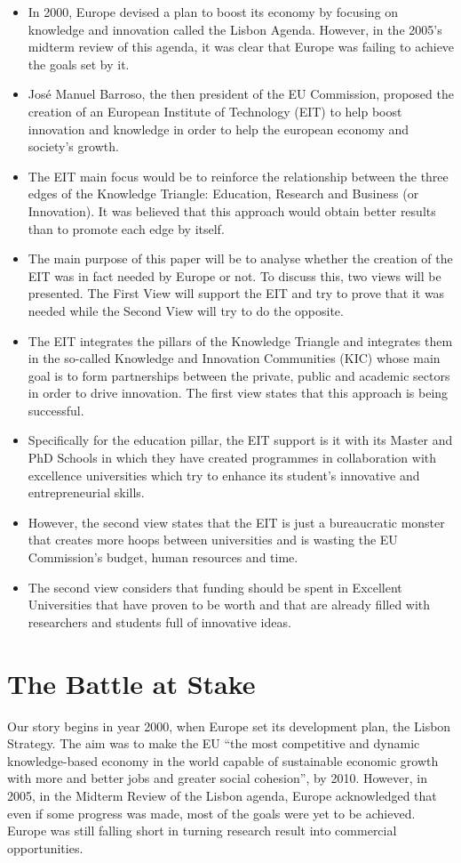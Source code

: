 \documentclass[11pt,a4paper,oneside,twocolumn]{IEEEtran}
\begin{document}
\begin{itemize}
    \item In 2000, Europe devised a plan to boost its economy by focusing on knowledge and innovation called the Lisbon Agenda. However, in the 2005’s midterm review of this agenda, it was clear that Europe was failing to achieve the goals set by it.
    \item José Manuel Barroso, the then president of the EU Commission, proposed the creation of an European Institute of Technology (EIT) to help boost innovation and knowledge in order to help the european economy and society’s growth.
    \item The EIT main focus would be to reinforce the relationship between the three edges of the Knowledge Triangle: Education, Research and Business (or Innovation). It was believed that this approach would obtain better results than to promote each edge by itself.
    \item The main purpose of this paper will be to analyse whether the creation of the EIT was in fact needed by Europe or not. To discuss this, two views will be presented. The First View will support the EIT and try to prove that it was needed while the Second View will try to do the opposite.
    \item The EIT integrates the pillars of the Knowledge Triangle and integrates them in the so-called Knowledge and Innovation Communities (KIC) whose main goal is to form partnerships between the private, public and academic sectors in order to drive innovation. The first view states that this approach is being successful.
    \item Specifically for the education pillar, the EIT support is it with its Master and PhD Schools in which they have created programmes in collaboration with excellence universities which try to enhance its student’s innovative and entrepreneurial skills.
    \item However, the second view states that the EIT is just a bureaucratic monster that creates more hoops between universities and is wasting the EU Commission’s budget, human resources and time.
    \item The second view considers that funding should be spent in Excellent Universities that have proven to be worth and that are already filled with researchers and students full of innovative ideas.
\end{itemize}

\section{The Battle at Stake}
Our story begins in year 2000, when Europe set its development plan, the Lisbon Strategy. The aim was to make the EU ``the most competitive and dynamic knowledge-based economy in the world capable of sustainable economic growth with more and better jobs and greater social cohesion''\cite{2_1}, by 2010. However, in 2005, in the Midterm Review of the Lisbon agenda, Europe acknowledged that even if some progress was made, most of the goals were yet to be achieved. Europe was still falling short in turning research result into commercial opportunities.
\end{document}
